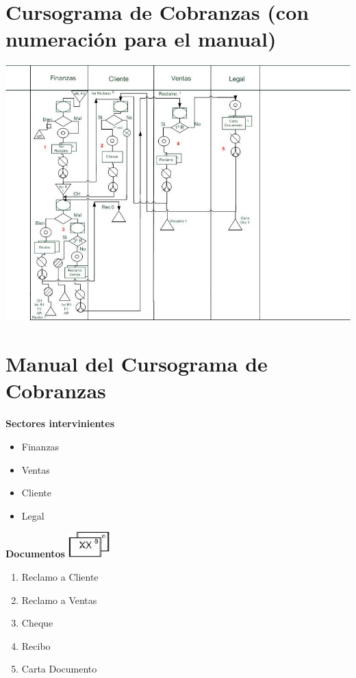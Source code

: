 \section{Cursograma de Cobranzas (con numeración para el manual)}
\begin{center}
 \includegraphics{Empresa/Circuitos/Cobranzas/Cursograma-para-manua-cobranzas-para-manual-correccion.jpg}
\end{center}

\pagebreak
\section{Manual del Cursograma de Cobranzas}

\begin{center}\textbf{Sectores intervinientes}\end{center}
\begin{itemize}
  \item Finanzas
  \item Ventas
  \item Cliente
  \item Legal
\end{itemize}

\begin{center}
  \textbf{Documentos}
  \includegraphics{./Images/Simbolos/simbolo-Documentos.png}
\end{center}
\begin{enumerate}
\item Reclamo a Cliente
\item Reclamo a Ventas
\item Cheque
\item Recibo
\item Carta Documento
\end{enumerate}

